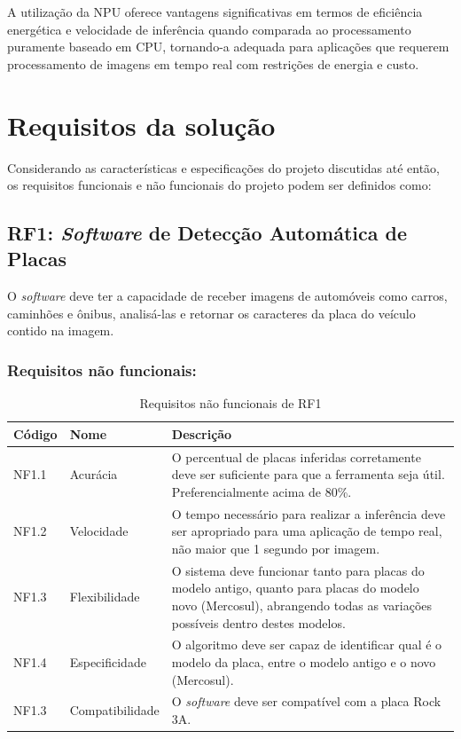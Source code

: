 A utilização da NPU oferece vantagens significativas em termos de eficiência energética e velocidade de inferência quando comparada ao processamento puramente baseado em CPU, tornando-a adequada para aplicações que requerem processamento de imagens em tempo real com restrições de energia e custo.

\section{Requisitos da solução}

Considerando as características e especificações do projeto discutidas até então, os requisitos funcionais e não funcionais do projeto podem ser definidos como:

\subsection{RF1: \textit{Software} de Detecção Automática de Placas}

O \textit{software} deve ter a capacidade de receber imagens de automóveis como carros, caminhões e ônibus, analisá-las e retornar os caracteres da placa do veículo contido na imagem.

\subsubsection{Requisitos não funcionais:}

\begin{table}[H]
    \centering
    \begin{tabular}{| m{2cm} | m{3.5cm} | m{8cm} |}
        \hline
        Código & Nome & Descrição \\
        \hline \hline
        NF1.1 & Acurácia & O percentual de placas inferidas corretamente deve ser suficiente para que a ferramenta seja útil. Preferencialmente acima de 80\%. \\
        \hline
        NF1.2 & Velocidade & O tempo necessário para realizar a inferência deve ser apropriado para uma aplicação de tempo real, não maior que 1 segundo por imagem. \\
        \hline
        NF1.3 & Flexibilidade & O sistema deve funcionar tanto para placas do modelo antigo, quanto para placas do modelo novo (Mercosul), abrangendo todas as variações possíveis dentro destes modelos. \\
        \hline
        NF1.4 & Especificidade & O algoritmo deve ser capaz de identificar qual é o modelo da placa, entre o modelo antigo e o novo (Mercosul). \\ 
        \hline
        NF1.3 & Compatibilidade & O \textit{software} deve ser compatível com a placa Rock 3A. \\
        \hline
    \end{tabular}
    \caption{Requisitos não funcionais de RF1}
    \label{tab:rf1_table}
\end{table}

